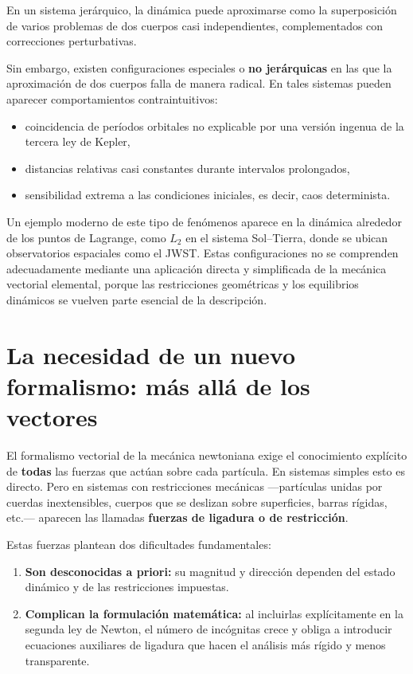 En un sistema jerárquico, la dinámica puede aproximarse como la superposición de varios problemas de dos cuerpos casi independientes, complementados con correcciones perturbativas.

Sin embargo, existen configuraciones especiales o \textbf{no jerárquicas} en las que la aproximación de dos cuerpos falla de manera radical. En tales sistemas pueden aparecer comportamientos contraintuitivos:
\begin{itemize}
    \item coincidencia de períodos orbitales no explicable por una versión ingenua de la tercera ley de Kepler,
    \item distancias relativas casi constantes durante intervalos prolongados,
    \item sensibilidad extrema a las condiciones iniciales, es decir, caos determinista.
\end{itemize}

Un ejemplo moderno de este tipo de fenómenos aparece en la dinámica alrededor de los puntos de Lagrange, como \(L_2\) en el sistema Sol--Tierra, donde se ubican observatorios espaciales como el JWST. Estas configuraciones no se comprenden adecuadamente mediante una aplicación directa y simplificada de la mecánica vectorial elemental, porque las restricciones geométricas y los equilibrios dinámicos se vuelven parte esencial de la descripción.

\section{La necesidad de un nuevo formalismo: más allá de los vectores}
El formalismo vectorial de la mecánica newtoniana exige el conocimiento explícito de \textbf{todas} las fuerzas que actúan sobre cada partícula. En sistemas simples esto es directo. Pero en sistemas con restricciones mecánicas —partículas unidas por cuerdas inextensibles, cuerpos que se deslizan sobre superficies, barras rígidas, etc.— aparecen las llamadas \textbf{fuerzas de ligadura o de restricción}.

Estas fuerzas plantean dos dificultades fundamentales:
\begin{enumerate}
    \item \textbf{Son desconocidas a priori:} su magnitud y dirección dependen del estado dinámico y de las restricciones impuestas.
    \item \textbf{Complican la formulación matemática:} al incluirlas explícitamente en la segunda ley de Newton, el número de incógnitas crece y obliga a introducir ecuaciones auxiliares de ligadura que hacen el análisis más rígido y menos transparente.
\end{enumerate}

